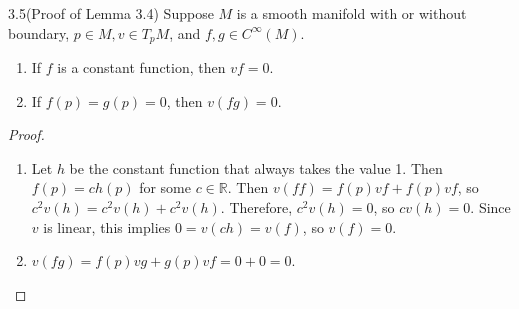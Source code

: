 \begin{customexer}{3.5(Proof of Lemma 3.4)}
  Suppose $M$ is a smooth manifold with or without boundary, $p \in M, v \in T_pM$, and $f, g \in C^{\infty}(M)$.
  \begin{enumerate}[label=(\alph*)]
    \item 
      If $f$ is a constant function, then $vf = 0$.
    \item
      If $f(p) = g(p) = 0$, then $v(fg) = 0$.
  \end{enumerate}
\end{customexer}

\begin{proof}
  $ $
  \begin{enumerate}[label=(\alph*)]
    \item
      Let $h$ be the constant function that always takes the value 1.
      Then $f(p) = ch(p)$ for some $c \in \mathbb{R}$.
      Then $v(ff) = f(p)vf + f(p)vf$, so $c^2v(h) = c^2v(h) + c^2v(h)$.
      Therefore, $c^2v(h) = 0$, so $cv(h) = 0$.
      Since $v$ is linear, this implies $0 = v(ch) = v(f)$, so $v(f) = 0$.
    \item
      $v(fg) = f(p)vg + g(p)vf = 0 + 0 = 0$.
  \end{enumerate}
\end{proof}
